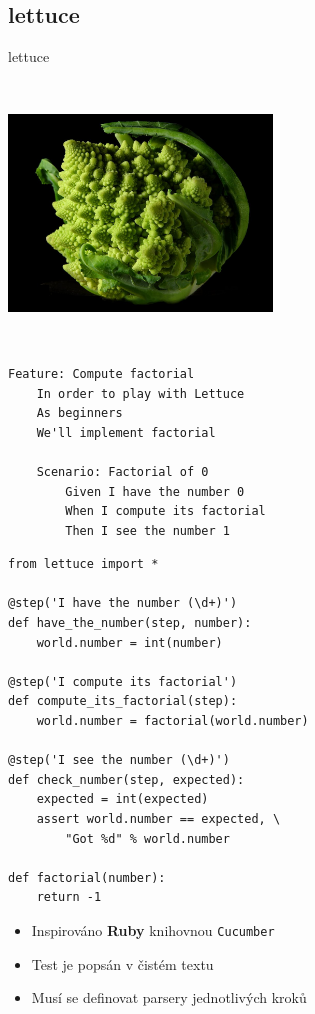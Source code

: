 \subsection{lettuce}

\begin{frame}
\begin{center}
\huge{lettuce}

\bigskip

\includegraphics[width=7cm,height=7cm]{images/lettuce.jpg}
\end{center}
\end{frame}

\begin{frame}[fragile]
\begin{verbatim}
Feature: Compute factorial
    In order to play with Lettuce
    As beginners
    We'll implement factorial

    Scenario: Factorial of 0
        Given I have the number 0
        When I compute its factorial
        Then I see the number 1
\end{verbatim}
\end{frame}

\begin{frame}[fragile]
\begin{verbatim}
from lettuce import *

@step('I have the number (\d+)')
def have_the_number(step, number):
    world.number = int(number)

@step('I compute its factorial')
def compute_its_factorial(step):
    world.number = factorial(world.number)

@step('I see the number (\d+)')
def check_number(step, expected):
    expected = int(expected)
    assert world.number == expected, \
        "Got %d" % world.number

def factorial(number):
    return -1
\end{verbatim}
\end{frame}

\begin{frame}
\begin{itemize}
\item Inspirováno {\bf Ruby} knihovnou {\tt Cucumber}
\item Test je popsán v čistém textu
\item Musí se definovat parsery jednotlivých kroků
\end{itemize}
\end{frame}
